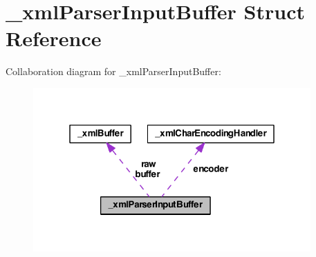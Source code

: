 \hypertarget{struct__xml_parser_input_buffer}{\section{\-\_\-xml\-Parser\-Input\-Buffer Struct Reference}
\label{struct__xml_parser_input_buffer}
}


Collaboration diagram for \-\_\-xml\-Parser\-Input\-Buffer\-:
\nopagebreak
\begin{figure}[H]
\begin{center}
\leavevmode
\includegraphics[width=301pt]{struct__xml_parser_input_buffer__coll__graph}
\end{center}
\end{figure}
